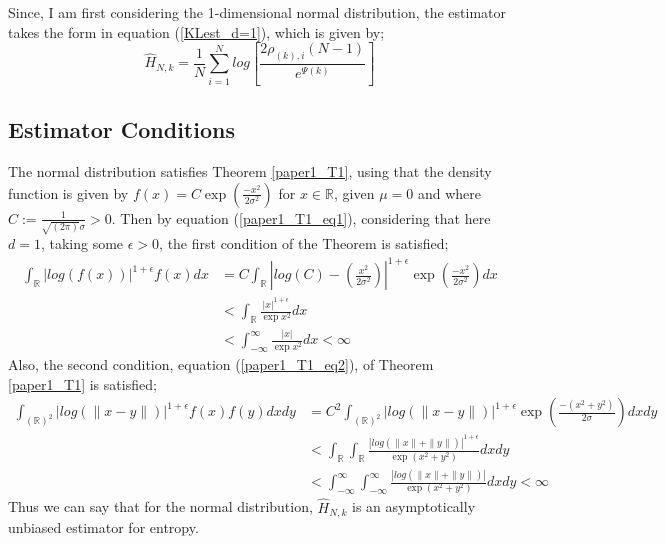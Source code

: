 \documentclass{report}
\begin{document}
Since, I am first considering the 1-dimensional normal distribution, the estimator takes the form in equation (\ref{KLest_d=1}), which is given by;
\begin{equation}
\hat{H}_{N, k} =  \frac{1}{N} \sum_{i=1}^{N} log \left[ \frac{2\rho_{(k),i}(N-1)}{e^{\Psi(k)}} \right]\nonumber
\end{equation}




\subsection{Estimator Conditions} \label{N_Conditions}
The normal distribution satisfies Theorem \ref{paper1_T1}, using that the density function is given by $f(x) = C \exp{ \left( \frac{-x^2}{2\sigma^2} \right)}$ for $x \in \mathbb{R}$, given $\mu = 0$ and where $C:= \frac{1}{\sqrt{(2\pi)} \sigma} > 0$. Then by equation (\ref{paper1_T1_eq1}), considering that here $d=1$, taking some $\epsilon >0$, the first condition of the Theorem is satisfied;
\begin{align} \nonumber
\int_{\mathbb{R}} | log(f(x))|^{1 + \epsilon} f(x) dx  &= C \int_{\mathbb{R}} \left| log \left( C \right) -  \left( \frac{x^2}{2\sigma^2} \right) \right|^{1 + \epsilon} \exp{ \left( \frac{-x^2}{2\sigma^2} \right)} dx \\ \nonumber
&< \int_{\mathbb{R}} \frac{|x|^{1 + \epsilon}}{ \exp{x^2}} dx \\ \nonumber
&< \int_{-\infty}^{\infty} \frac{|x|}{ \exp{x^2}} dx < \infty \nonumber
\end{align}
Also, the second condition, equation (\ref{paper1_T1_eq2}), of Theorem \ref{paper1_T1} is satisfied;
\begin{align} \nonumber
\int_{(\mathbb{R})^2} | log(\|x-y\|)|^{1+ \epsilon} f(x) f(y) dx dy  &= C^2 \int_{(\mathbb{R})^2} | log(\|x-y\|)|^{1+ \epsilon} \exp{\left(\frac{-(x^2 + y^2)}{2 \sigma}\right)} dx dy \\ \nonumber
&< \int_{\mathbb{R}} \int_{\mathbb{R}} \frac{| log(\|x\| + \|y\|)|^{1+ \epsilon}}{\exp{(x^2 + y^2)}} dx dy \\ \nonumber
&< \int_{-\infty}^{\infty} \int_{-\infty}^{\infty} \frac{| log(\|x\| + \|y\|)|}{\exp{(x^2 + y^2)}} dx dy < \infty  \nonumber
\end{align}
Thus we can say that for the normal distribution, $\hat{H}_{N,k}$ is an asymptotically unbiased estimator for entropy. 
\end{document}
